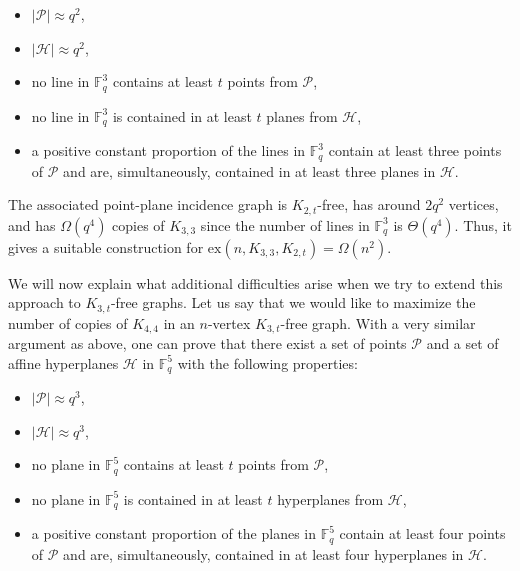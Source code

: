 \documentclass[12pt]{article}
\newcommand{\ex}{\mathrm{ex}}
\begin{document}
\begin{itemize}
    \item $|\mathcal{P}|\approx q^2$,
    \item $|\mathcal{H}|\approx q^2$,
    \item no line in $\mathbb{F}_q^3$ contains at least $t$ points from $\mathcal{P}$,
    \item no line in $\mathbb{F}_q^3$ is contained in at least $t$ planes from $\mathcal{H}$,
    \item a positive constant proportion of the lines in $\mathbb{F}_q^3$ contain at least three points of $\mathcal{P}$ and are, simultaneously, contained in at least three planes in $\mathcal{H}$.
\end{itemize}
The associated point-plane incidence graph is $K_{2,t}$-free, has around $2q^2$ vertices, and has $\Omega(q^4)$ copies of $K_{3,3}$ since the number of lines in $\mathbb{F}_q^3$ is $\Theta(q^4)$. Thus, it gives a suitable construction for $\ex(n,K_{3,3},K_{2,t})=\Omega(n^2)$.

We will now explain what additional difficulties arise when we try to extend this approach to $K_{3,t}$-free graphs. Let us say that we would like to maximize the number of copies of $K_{4,4}$ in an $n$-vertex $K_{3,t}$-free graph. With a very similar argument as above, one can prove that there exist a set of points $\mathcal{P}$ and a set of affine hyperplanes $\mathcal{H}$ in $\mathbb{F}_q^5$ with the following properties:
\begin{itemize}
    \item $|\mathcal{P}|\approx q^3$,
    \item $|\mathcal{H}|\approx q^3$,
    \item no plane in $\mathbb{F}_q^5$ contains at least $t$ points from $\mathcal{P}$,
    \item no plane in $\mathbb{F}_q^5$ is contained in at least $t$ hyperplanes from $\mathcal{H}$,
    \item a positive constant proportion of the planes in $\mathbb{F}_q^5$ contain at least four points of $\mathcal{P}$ and are, simultaneously, contained in at least four hyperplanes in $\mathcal{H}$.
\end{itemize}
\end{document}

